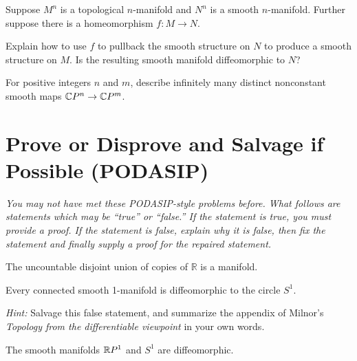 \documentclass{homework}
\begin{document}
\begin{problem}
  Suppose $M^n$ is a topological $n$-manifold and $N^n$ is a smooth
  $n$-manifold.  Further suppose there is a homeomorphism
  $f : M \to N$.

  Explain how to use $f$ to pullback the smooth structure on $N$ to
  produce a smooth structure on $M$.  Is the resulting smooth manifold
  diffeomorphic to $N$?
\end{problem}

\begin{problem}
  For positive integers $n$ and $m$, describe infinitely many distinct
  nonconstant smooth maps $\mathbb{C}P^n \to \mathbb{C}P^m$.
\end{problem}


\section{Prove or Disprove and Salvage if Possible (PODASIP)}

\textit{You may not have met these PODASIP-style problems before.
  What follows are statements which may be ``true'' or ``false.''  If
  the statement is true, you must provide a proof.  If the statement
  is false, explain why it is false, then fix the statement and
  finally supply a proof for the repaired statement.}

\begin{problem}
  The uncountable disjoint union of copies of $\mathbb{R}$ is a manifold.
\end{problem}

\begin{problem}
  Every connected smooth 1-manifold is diffeomorphic to the circle $S^1$.
  
  \textit{Hint:} Salvage this false statement, and summarize the
  appendix of Milnor's \textit{Topology from the differentiable
    viewpoint} in your own words.
\end{problem}

\begin{problem}
  The smooth manifolds $\mathbb{R}P^1$ and $S^1$ are diffeomorphic.
\end{problem}
\end{document}
